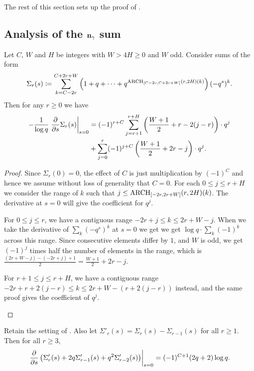 The rest of this section sets up the proof of .

\subsection{Analysis of the $\mathbf n_\gamma$ sum}
\begin{lemma}
  \label{lem:derivative_nn}
  Let $C$, $W$ and $H$ be integers with $W > 4H \ge 0$ and $W$ odd.
  Consider sums of the form
  \[ \Sigma_r(s) \coloneqq \sum_{k=C-2r}^{C+2r+W} \left( 1 + q + \dots
    + q^{\operatorname*{ARCH}_{[C-2r, C+2r+W]}(r, 2H)(k)} \right) (-q^s)^k. \]
  Then for any $r \ge 0$ we have
  \begin{align*}
    - \frac{1}{\log q} \left. \pdv{}{s} \Sigma_r(s) \right\rvert_{s=0}
    &= (-1)^{r+C} \sum_{j=r+1}^{r+H} \left( \frac{W+1}{2} + r - 2(j-r) \right) \cdot q^j \\
      &+ \sum_{j=0}^{r} (-1)^{j+C} \left( \frac{W+1}{2} + 2r - j \right) \cdot q^j.
  \end{align*}
\end{lemma}
\begin{proof}
  Since $\Sigma_r(0) = 0$, the effect of $C$ is just multiplication by $(-1)^C$
  and hence we assume without loss of generality that $C = 0$.
  For each $0 \le j \le r+H$ we consider the range of $k$
  such that $j \le \operatorname*{ARCH}_{[-2r, 2r+W]}(r, 2H)(k)$.
  The derivative at $s = 0$ will give the coefficient for $q^j$.
  \begin{itemize}
    \ii For $0 \le j \le r$, we have a contiguous range $-2r + j \le k \le 2r+W-j$.
    When we take the derivative of $\sum_k (-q^s)^k$ at $s = 0$ we get
    we get $\log q \cdot \sum_k (-1)^k$ across this range.
    Since consecutive elements differ by $1$, and $W$ is odd,
    we get $(-1)^j$ times half the number of elements in the range,
    which is $\frac{(2r+W-j) - (-2r+j) + 1}{2} = \frac{W+1}{2} + 2r - j$.

    \ii For $r+1 \le j \le r+H$, we have a contiguous range
    $-2r + r + 2(j-r) \le k \le 2r+W-(r + 2(j-r))$ instead,
    and the same proof gives the coefficient of $q^j$.
    \qedhere
  \end{itemize}
\end{proof}
\begin{corollary}
  \label{cor:derivative_nn}
  Retain the setting of .
  Also let $\Sigma'_r(s) = \Sigma_r(s) - \Sigma_{r-1}(s)$ for all $r \ge 1$.
  Then for all $r \ge 3$,
  \[
    \left. \pdv{}{s}
      \left( \Sigma'_r(s) + 2q \Sigma'_{r-1}(s) + q^2 \Sigma'_{r-2}(s) \right)
      \right\rvert_{s=0}
      = (-1)^{C+1} (2q+2) \log q.
  \]
\end{corollary}
